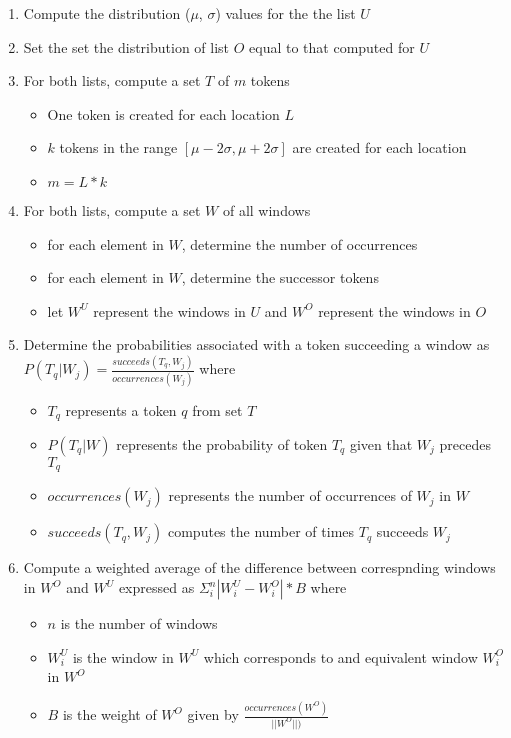\begin{enumerate}
\item Compute the distribution ($\mu$, $\sigma$) values for the 
  the list $U$
\item Set the set the distribution of list $O$ equal to that 
  computed for $U$
\item For both lists, compute a set $T$ of $m$ tokens
  \begin{itemize}
  \item One token is created for each location $L$ 
  \item $k$ tokens in the range $[\mu-2\sigma, \mu+2\sigma]$
    are created for each location
  \item $m = L * k$
  \end{itemize}
\item For both lists, compute a set $W$ of all windows
  \begin{itemize}
  \item for each element in $W$, determine the number of occurrences
  \item for each element in $W$, determine the successor tokens
  \item let $W^U$ represent the windows in $U$ and
    $W^O$ represent the windows in $O$
  \end{itemize}
\item Determine the probabilities associated with a token succeeding a window
  as $P(T_q|W_j) = \frac{succeeds(T_q, W_j)}{occurrences(W_j)}$ where
  \begin{itemize}
  \item $T_q$ represents a token $q$ from set $T$
  \item $P(T_q|W)$ represents the probability 
    of token $T_q$ given that $W_j$ precedes $T_q$
  \item $occurrences(W_j)$ represents the number of occurrences of $W_j$ in $W$
  \item $succeeds(T_q, W_j)$ computes the number of times $T_q$ succeeds $W_j$
  \end{itemize}
\item Compute a weighted average of the difference between correspnding windows
  in $W^O$ and $W^U$ expressed as $\Sigma_i^n |W_i^U-W_i^O| * B$ where
  \begin{itemize}
  \item $n$ is the number of windows
  \item $W_i^U$ is the window in $W^U$ which corresponds to
    and equivalent window $W_i^O$ in $W^O$
  \item $B$ is the weight of $W^O$ given by $\frac{occurrences(W^O)}{||W^O||)}$

\end{itemize}
\end{enumerate}
